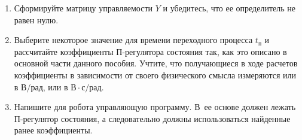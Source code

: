 \documentclass[12pt,a4paper,openany]{extarticle}
\begin{document}
\begin{enumerate}
	Отдельно стоит отметить тот факт, что при расчете момента инерции <<тела>> Segway входящие в него командный блок, датчик HiTechnic Gyro Sensor и моторы NXT следует принять за однородные параллелепипеды (см.~рис.~\ref{paraps}\footnote{Момент инерции показанной на данном рисунке конструкции, относительно горизонтальной оси, проходящей через ее центр масс и перпендикулярной направлению движения робота, есть сумма моментов инерции относительно нее каждого из параллелепипедов. 
Напоминаем, что последние можно определить с помощью теоремы Штейнера	.}).
	
\begin{figure}[h]
	\noindent{}
	\caption{Аппроксимация <<тела>> Segway параллелепипедами.}
	\label{paraps}
\end{figure}
  
  	\item Сформируйте матрицу управляемости $Y$ и убедитесь, что ее определитель не равен нулю.
	\item Выберите некоторое значение для времени переходного процесса $t_\text{п}$ и рассчитайте коэффициенты П-регулятора состояния так, как это описано в основной части данного пособия.
	Учтите, что получающиеся в ходе расчетов коэффициенты в зависимости от своего физического смысла измеряются или в $\text{В}/\text{рад}$, или в $\text{В}\cdot\text{с}/\text{рад}$.
	\item Напишите для робота управляющую программу.
	В~ее основе должен лежать П-регулятор состояния, а следовательно должны использоваться найденные ранее коэффициенты.
	

\end{enumerate}
\end{document}
